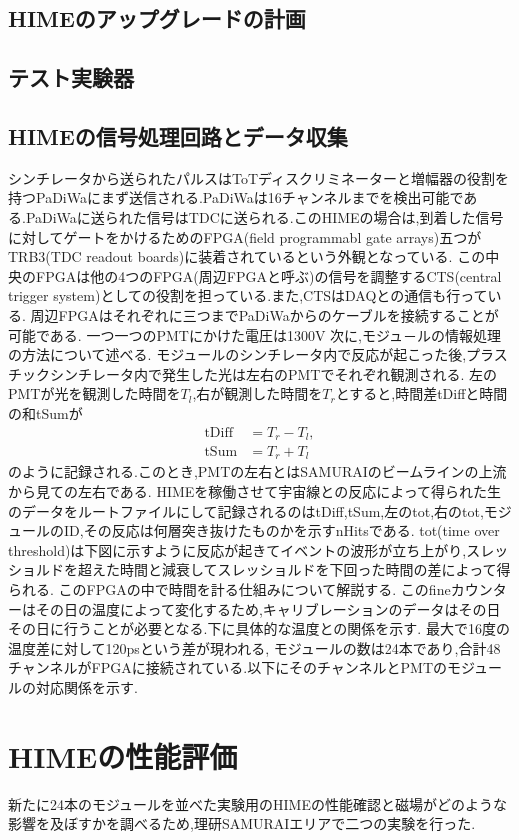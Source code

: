 \documentclass[dvipdfmx]{jsreport}
\begin{document}
\section{HIMEのアップグレードの計画}
\section{テスト実験器}

\section{HIMEの信号処理回路とデータ収集}
シンチレータから送られたパルスはToTディスクリミネーターと増幅器の役割を持つPaDiWaにまず送信される.PaDiWaは16チャンネルまでを検出可能である.PaDiWaに送られた信号はTDCに送られる.このHIMEの場合は,到着した信号に対してゲートをかけるためのFPGA(field programmabl gate arrays)五つがTRB3(TDC readout boards)に装着されているという外観となっている.
この中央のFPGAは他の4つのFPGA(周辺FPGAと呼ぶ)の信号を調整するCTS(central trigger system)としての役割を担っている.また,CTSはDAQとの通信も行っている.
周辺FPGAはそれぞれに三つまでPaDiWaからのケーブルを接続することが可能である.
一つ一つのPMTにかけた電圧は1300V
次に,モジュ－ルの情報処理の方法について述べる.
モジュールのシンチレータ内で反応が起こった後,プラスチックシンチレータ内で発生した光は左右のPMTでそれぞれ観測される.
左のPMTが光を観測した時間を$T_l$,右が観測した時間を$T_r$とすると,時間差tDiffと時間の和tSumが\begin{align}\mathrm{tDiff}&=T_r-T_l,\\\mathrm{tSum}&=T_r+T_l\end{align}のように記録される.このとき,PMTの左右とはSAMURAIのビームラインの上流から見ての左右である.
HIMEを稼働させて宇宙線との反応によって得られた生のデータをルートファイルにして記録されるのはtDiff,tSum,左のtot,右のtot,モジュールのID,その反応は何層突き抜けたものかを示すnHitsである.
tot(time over threshold)は下図に示すように反応が起きてイベントの波形が立ち上がり,スレッショルドを超えた時間と減衰してスレッショルドを下回った時間の差によって得られる.
このFPGAの中で時間を計る仕組みについて解説する.
このfineカウンターはその日の温度によって変化するため,キャリブレーションのデータはその日その日に行うことが必要となる.下に具体的な温度との関係を示す.
最大で16度の温度差に対して120psという差が現われる,
モジュールの数は24本であり,合計48チャンネルがFPGAに接続されている.以下にそのチャンネルとPMTのモジュールの対応関係を示す.

\chapter{HIMEの性能評価}
新たに24本のモジュールを並べた実験用のHIMEの性能確認と磁場がどのような影響を及ぼすかを調べるため,理研SAMURAIエリアで二つの実験を行った.
\end{document}

